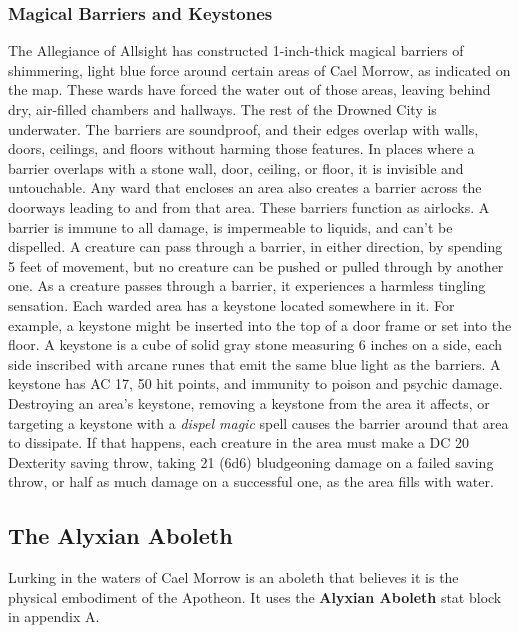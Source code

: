 \documentclass[10pt,a4,twoside,twocolumn,openany,nodeprecatedcode]{dndbook}
\begin{document}
\subsubsection{Magical Barriers and Keystones}
The Allegiance of Allsight has constructed 1-inch-thick magical barriers of shimmering, light blue force around certain areas of Cael Morrow, as indicated on the map. These wards have forced the water out of those areas, leaving behind dry, air-filled chambers and hallways. The rest of the Drowned City is underwater.
The barriers are soundproof, and their edges overlap with walls, doors, ceilings, and floors without harming those features. In places where a barrier overlaps with a stone wall, door, ceiling, or floor, it is invisible and untouchable.
Any ward that encloses an area also creates a barrier across the doorways leading to and from that area. These barriers function as airlocks.
A barrier is immune to all damage, is impermeable to liquids, and can't be dispelled. A creature can pass through a barrier, in either direction, by spending 5 feet of movement, but no creature can be pushed or pulled through by another one. As a creature passes through a barrier, it experiences a harmless tingling sensation.
Each warded area has a keystone located somewhere in it. For example, a keystone might be inserted into the top of a door frame or set into the floor. A keystone is a cube of solid gray stone measuring 6 inches on a side, each side inscribed with arcane runes that emit the same blue light as the barriers. A keystone has AC 17, 50 hit points, and immunity to poison and psychic damage. Destroying an area's keystone, removing a keystone from the area it affects, or targeting a keystone with a \textit{dispel magic} spell causes the barrier around that area to dissipate. If that happens, each creature in the area must make a DC 20 Dexterity saving throw, taking 21 (6d6) bludgeoning damage on a failed saving throw, or half as much damage on a successful one, as the area fills with water.
\subsection{The Alyxian Aboleth}
Lurking in the waters of Cael Morrow is an aboleth that believes it is the physical embodiment of the Apotheon. It uses the \textbf{Alyxian Aboleth} stat block in appendix A.
\end{document}
